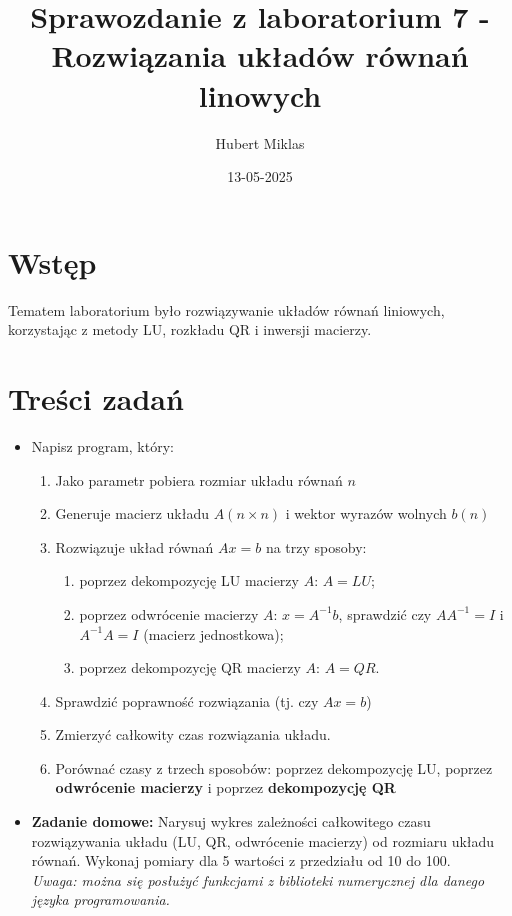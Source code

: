 \documentclass[a4paper,12pt]{article}
\title{Sprawozdanie z laboratorium 7 - Rozwiązania układów równań linowych}
\author{Hubert Miklas}
\date{13-05-2025}
\begin{document}
\maketitle

\section{Wstęp}

Tematem laboratorium było rozwiązywanie układów równań liniowych, korzystając z metody LU, rozkładu QR i inwersji macierzy.

\section{Treści zadań}


\begin{itemize}
    \item Napisz program, który:
    \begin{enumerate}
        \item Jako parametr pobiera rozmiar układu równań $n$
        \item Generuje macierz układu $A(n \times n)$ i wektor wyrazów wolnych $b(n)$
        \item Rozwiązuje układ równań $Ax = b$ na trzy sposoby:
        \begin{enumerate}
            \item poprzez dekompozycję LU macierzy $A$: $A = LU$;
            \item poprzez odwrócenie macierzy $A$: $x = A^{-1}b$, sprawdzić czy $AA^{-1} = I$ i $A^{-1}A = I$ (macierz jednostkowa);
            \item poprzez dekompozycję QR macierzy $A$: $A = QR$.
        \end{enumerate}
        \item Sprawdzić poprawność rozwiązania (tj. czy $Ax = b$)
        \item Zmierzyć całkowity czas rozwiązania układu.
        \item Porównać czasy z trzech sposobów: poprzez dekompozycję LU, poprzez \textbf{odwrócenie macierzy} i poprzez \textbf{dekompozycję QR}
    \end{enumerate}
    
    \item \textbf{Zadanie domowe:} Narysuj wykres zależności całkowitego czasu rozwiązywania układu (LU, QR, odwrócenie macierzy) od rozmiaru układu równań. Wykonaj pomiary dla 5 wartości z przedziału od 10 do 100. \\
    \textit{Uwaga: można się posłużyć funkcjami z biblioteki numerycznej dla danego języka programowania.}
\end{itemize}
\end{document}
